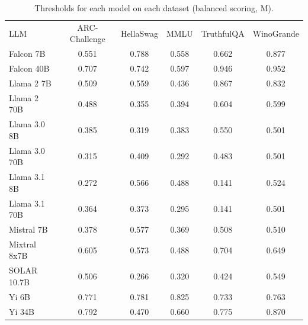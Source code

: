 \begin{table}[h]
\caption{Thresholds for each model on each dataset (balanced scoring, M). }
\label{tab:thresholds_prob_max_k20_w1}
\centering
\begin{tabular}{l S[table-format=3.1] S[table-format=3.1] S[table-format=3.1] S[table-format=3.1] S[table-format=3.1]}
\toprule
LLM & ARC-Challenge & HellaSwag & MMLU & TruthfulQA & WinoGrande \\ 
\cmidrule(lr){1-1} \cmidrule(lr){2-2} \cmidrule(lr){3-3} \cmidrule(lr){4-4} \cmidrule(lr){5-5} \cmidrule(lr){6-6}
Falcon 7B & 0.551 & 0.788 & 0.558 & 0.662 & 0.877\\
Falcon 40B & 0.707 & 0.742 & 0.597 & 0.946 & 0.952\\
Llama 2 7B & 0.509 & 0.559 & 0.436 & 0.867 & 0.832\\
Llama 2 70B & 0.488 & 0.355 & 0.394 & 0.604 & 0.599\\
Llama 3.0 8B & 0.385 & 0.319 & 0.383 & 0.550 & 0.501\\
Llama 3.0 70B & 0.315 & 0.409 & 0.292 & 0.483 & 0.501\\
Llama 3.1 8B & 0.272 & 0.566 & 0.488 & 0.141 & 0.524\\
Llama 3.1 70B & 0.364 & 0.373 & 0.295 & 0.141 & 0.501\\
Mistral 7B & 0.378 & 0.577 & 0.369 & 0.508 & 0.510\\
Mixtral 8x7B & 0.605 & 0.573 & 0.488 & 0.704 & 0.649\\
SOLAR 10.7B & 0.506 & 0.266 & 0.320 & 0.424 & 0.549\\
Yi 6B & 0.771 & 0.781 & 0.825 & 0.733 & 0.763\\
Yi 34B & 0.792 & 0.470 & 0.660 & 0.775 & 0.870\\
\bottomrule
\end{tabular}
\end{table}

